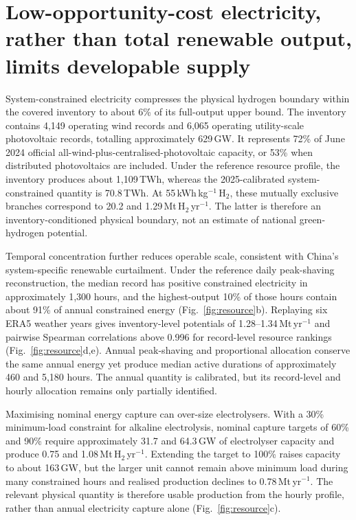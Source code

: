 \documentclass[lineno,pdflatex,sn-nature]{sn-jnl}
\begin{document}
\section*{Low-opportunity-cost electricity, rather than total renewable output, limits developable supply}

System-constrained electricity compresses the physical hydrogen boundary within the covered inventory to about 6\% of its full-output upper bound. The inventory contains 4,149 operating wind records and 6,065 operating utility-scale photovoltaic records, totalling approximately 629\,GW. It represents 72\% of June 2024 official all-wind-plus-centralised-photovoltaic capacity, or 53\% when distributed photovoltaics are included. Under the reference resource profile, the inventory produces about 1,109\,TWh, whereas the 2025-calibrated system-constrained quantity is 70.8\,TWh. At 55\,kWh\,kg$^{-1}$\,H$_2$, these mutually exclusive branches correspond to 20.2 and 1.29\,Mt\,H$_2$\,yr$^{-1}$. The latter is therefore an inventory-conditioned physical boundary, not an estimate of national green-hydrogen potential.

Temporal concentration further reduces operable scale, consistent with China's system-specific renewable curtailment\cite{guo2023grid}. Under the reference daily peak-shaving reconstruction, the median record has positive constrained electricity in approximately 1,300 hours, and the highest-output 10\% of those hours contain about 91\% of annual constrained energy (Fig.~\ref{fig:resource}b). Replaying six ERA5 weather years gives inventory-level potentials of 1.28--1.34\,Mt\,yr$^{-1}$ and pairwise Spearman correlations above 0.996 for record-level resource rankings (Fig.~\ref{fig:resource}d,e). Annual peak-shaving and proportional allocation conserve the same annual energy yet produce median active durations of approximately 460 and 5,180 hours. The annual quantity is calibrated, but its record-level and hourly allocation remains only partially identified.

Maximising nominal energy capture can over-size electrolysers. With a 30\% minimum-load constraint for alkaline electrolysis, nominal capture targets of 60\% and 90\% require approximately 31.7 and 64.3\,GW of electrolyser capacity and produce 0.75 and 1.08\,Mt\,H$_2$\,yr$^{-1}$. Extending the target to 100\% raises capacity to about 163\,GW, but the larger unit cannot remain above minimum load during many constrained hours and realised production declines to 0.78\,Mt\,yr$^{-1}$. The relevant physical quantity is therefore usable production from the hourly profile, rather than annual electricity capture alone (Fig.~\ref{fig:resource}c).
\end{document}
